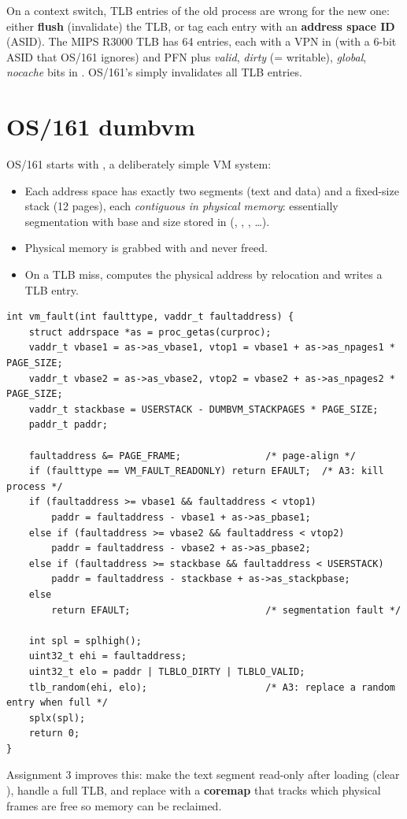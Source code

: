 On a context switch, TLB entries of the old process are wrong for the new one: either
\textbf{flush} (invalidate) the TLB, or tag each entry with an \textbf{address space ID}
(ASID). The MIPS R3000 TLB has 64 entries, each with a VPN in  (with a 6-bit ASID
that OS/161 ignores) and PFN plus \emph{valid}, \emph{dirty} (= writable), \emph{global},
\emph{nocache} bits in . OS/161's  simply invalidates all TLB
entries.

\section{OS/161 dumbvm}

OS/161 starts with , a deliberately simple VM system:
\begin{itemize}
  \item Each address space has exactly two segments (text and data) and a fixed-size stack
    (12 pages), each \emph{contiguous in physical memory}: essentially segmentation with base
    and size stored in  (, ,
    , \ldots).
  \item Physical memory is grabbed with  and never freed.
  \item On a TLB miss,  computes the physical address by relocation and writes a
    TLB entry.
\end{itemize}
\begin{lstlisting}[style=c]
int vm_fault(int faulttype, vaddr_t faultaddress) {
    struct addrspace *as = proc_getas(curproc);
    vaddr_t vbase1 = as->as_vbase1, vtop1 = vbase1 + as->as_npages1 * PAGE_SIZE;
    vaddr_t vbase2 = as->as_vbase2, vtop2 = vbase2 + as->as_npages2 * PAGE_SIZE;
    vaddr_t stackbase = USERSTACK - DUMBVM_STACKPAGES * PAGE_SIZE;
    paddr_t paddr;

    faultaddress &= PAGE_FRAME;               /* page-align */
    if (faulttype == VM_FAULT_READONLY) return EFAULT;  /* A3: kill process */
    if (faultaddress >= vbase1 && faultaddress < vtop1)
        paddr = faultaddress - vbase1 + as->as_pbase1;
    else if (faultaddress >= vbase2 && faultaddress < vtop2)
        paddr = faultaddress - vbase2 + as->as_pbase2;
    else if (faultaddress >= stackbase && faultaddress < USERSTACK)
        paddr = faultaddress - stackbase + as->as_stackpbase;
    else
        return EFAULT;                        /* segmentation fault */

    int spl = splhigh();
    uint32_t ehi = faultaddress;
    uint32_t elo = paddr | TLBLO_DIRTY | TLBLO_VALID;
    tlb_random(ehi, elo);                     /* A3: replace a random entry when full */
    splx(spl);
    return 0;
}
\end{lstlisting}
Assignment 3 improves this: make the text segment read-only after loading (clear
), handle a full TLB, and replace  with a \textbf{coremap}
that tracks which physical frames are free so memory can be reclaimed.

